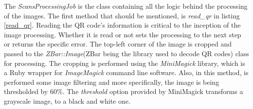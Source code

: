 

The \textit{ScansProcessingJob} is the class containing all the logic behind the processing of the images. The first method that should be mentioned, is \textit{read\_qr} in listing \ref{read_qr}. Reading the QR code's information is critical to the inception of the image processing. Whether it is read or not sets the processing to the next step or returns the specific error. The top-left corner of the image is cropped and passed to the \textit{ZBar::Image}(ZBar being the library used to decode QR codes) class for processing. The cropping is performed using the \textit{MiniMagick} library, which is a Ruby wrapper for \textit{ImageMagick} command line software. Also, in this method, is performed some image filtering and more specifically, the image is being thresholded by 60\%. The \textit{threshold} option provided by MiniMagick transforms a grayscale image, to a black and white one. 





\clearpage